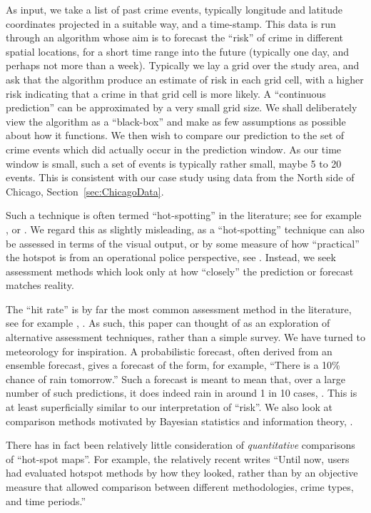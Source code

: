 \documentclass[twoside,a4paper,twocolumn,10pt]{article}
\theoremstyle{plain}
\theoremstyle{definition}
\begin{document}
As input, we take a list of past crime events, typically longitude and latitude
coordinates projected in a suitable way, and a time-stamp.  This data is run through
an algorithm whose aim is to forecast the ``risk'' of crime in different spatial
locations, for a short time range into the future (typically one day, and perhaps not
more than a week).  Typically we lay a grid over the study area, and ask that the
algorithm produce an estimate of risk in each grid cell, with a higher risk indicating
that a crime in that grid cell is more likely.  A ``continuous prediction'' can be
approximated by a very small grid size.  We shall deliberately view the algorithm
as a ``black-box'' and make as few assumptions as possible about how it functions.
We then wish to compare our prediction to the set of crime events which did actually
occur in the prediction window.  As our time window is small, such a set of events is
typically rather small, maybe 5 to 20 events.  This is consistent with our case study
using data from the North side of Chicago, Section~\ref{sec:ChicagoData}.

Such a technique is often termed ``hot-spotting'' in the literature; see for example
\cite{rand}, or \cite{bjp}.  We regard this as slightly misleading, as a ``hot-spotting''
technique can also be assessed in terms of the visual output, or by some measure
of how ``practical'' the hotspot is from an operational police perspective, see
\cite{bjp, arc}.  Instead, we seek assessment methods which look only at how
``closely'' the prediction or forecast matches reality.

The ``hit rate'' is by far the most common assessment method in the literature,
see for example \cite{arc, bjp, sepp}, \cite[Chapter~5]{rand}.
As such, this paper can thought of as an
exploration of alternative assessment techniques, rather than a simple survey.
We have turned to meteorology for inspiration.  A probabilistic forecast, often
derived from an ensemble forecast, gives a forecast of the form, for example,
``There is a 10\% chance of rain tomorrow.''  Such a forecast is meant to mean
that, over a large number of such predictions, it does indeed rain in around 1 in
10 cases, \cite[Chapter~7]{js}.  This is at least superficially
similar to our interpretation of ``risk''.  We also look at comparison methods
motivated by Bayesian statistics and information theory, \cite{gcsr, mackay}.

There has in fact been relatively little consideration of \emph{quantitative}
comparisons of ``hot-spot maps''.  For example, the relatively recent
\cite{levine} writes ``Until now, users had evaluated hotspot methods
by how they looked, rather than by an objective measure that allowed
comparison between different methodologies, crime types, and time periods.''
\end{document}
